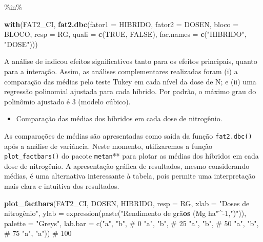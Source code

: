 \documentclass[
]{book}
\newenvironment{Shaded}{\begin{snugshade}}{\end{snugshade}}
\newcommand{\DataTypeTok}[1]{\textcolor[rgb]{0.13,0.29,0.53}{#1}}
\newcommand{\KeywordTok}[1]{\textcolor[rgb]{0.13,0.29,0.53}{\textbf{#1}}}
\newcommand{\NormalTok}[1]{#1}
\newcommand{\OtherTok}[1]{\textcolor[rgb]{0.56,0.35,0.01}{#1}}
\newcommand{\StringTok}[1]{\textcolor[rgb]{0.31,0.60,0.02}{#1}}
\providecommand{\tightlist}{%
  \setlength{\itemsep}{0pt}\setlength{\parskip}{0pt}}
\begin{document}
\%in\%

\begin{Shaded}
\begin{Highlighting}[]
\KeywordTok{with}\NormalTok{(FAT2_CI, }
     \KeywordTok{fat2.dbc}\NormalTok{(}\DataTypeTok{fator1 =}\NormalTok{  HIBRIDO,}
     \DataTypeTok{fator2 =}\NormalTok{  DOSEN,}
     \DataTypeTok{bloco =}\NormalTok{ BLOCO,}
     \DataTypeTok{resp =}\NormalTok{  RG,}
     \DataTypeTok{quali =} \KeywordTok{c}\NormalTok{(}\OtherTok{TRUE}\NormalTok{, }\OtherTok{FALSE}\NormalTok{),}
     \DataTypeTok{fac.names =} \KeywordTok{c}\NormalTok{(}\StringTok{"HIBRIDO"}\NormalTok{, }\StringTok{"DOSE"}\NormalTok{)))}
\end{Highlighting}
\end{Shaded}

A análise de indicou efeitos significativos tanto para os efeitos principais, quanto para a interação. Assim, as análises complementares realizadas foram (i) a comparação das médias pelo teste Tukey em cada nível da dose de N; e (ii) uma regressão polinomial ajustada para cada híbrido. Por padrão, o máximo grau do polinômio ajustado é 3 (modelo cúbico).

\begin{itemize}
\tightlist
\item
  Comparação das médias dos híbridos em cada dose de nitrogênio.
\end{itemize}

As comparações de médias são apresentadas como saída da função \texttt{fat2.dbc()} após a análise de variância. Neste momento, utilizaremos a função \texttt{plot\_factbars()}  do pacote \texttt{metan}** para plotar as médias dos híbridos em cada dose de nitrogênio. A apresentação gráfica de resultados, mesmo considerando médias, é uma alternativa interessante à tabela, pois permite uma interpretação mais clara e intuitiva dos resultados.

\begin{Shaded}
\begin{Highlighting}[]
\KeywordTok{plot_factbars}\NormalTok{(FAT2_CI, DOSEN, HIBRIDO,}
              \DataTypeTok{resp =}\NormalTok{ RG,}
              \DataTypeTok{xlab =} \StringTok{"Doses de nitrogênio",}
\StringTok{              ylab = expression(paste("}\NormalTok{Rendimento de grã}\KeywordTok{os}\NormalTok{ (Mg ha}\StringTok{"^-1,"}\NormalTok{)}\StringTok{")),}
\StringTok{              palette = "}\NormalTok{Greys}\StringTok{",}
\StringTok{              lab.bar = c("}\NormalTok{a}\StringTok{", "}\NormalTok{b}\StringTok{", # 0}
\StringTok{                          "}\NormalTok{a}\StringTok{", "}\NormalTok{b}\StringTok{", # 25}
\StringTok{                          "}\NormalTok{a}\StringTok{", "}\NormalTok{b}\StringTok{", # 50}
\StringTok{                          "}\NormalTok{a}\StringTok{", "}\NormalTok{b}\StringTok{", # 75}
\StringTok{                          "}\NormalTok{a}\StringTok{", "}\NormalTok{a}\StringTok{")) # 100}
\end{Highlighting}
\end{Shaded}
\end{document}
